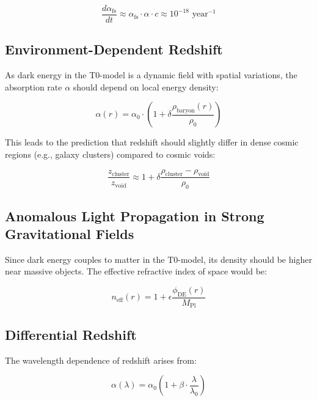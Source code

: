 \documentclass[a4paper,12pt]{article}
\theoremstyle{definition}
\theoremstyle{remark}
\begin{document}
	\begin{equation}
		\frac{d\alpha_{\text{fs}}}{dt} \approx \alpha_{\text{fs}} \cdot \alpha \cdot c \approx 10^{-18} \text{ year}^{-1}
	\end{equation}
	
	\subsection{Environment-Dependent Redshift}
	
	As dark energy in the T0-model is a dynamic field with spatial variations, the absorption rate \(\alpha\) should depend on local energy density:
	
	\begin{equation}
		\alpha(r) = \alpha_0 \cdot \left(1 + \delta\frac{\rho_{\text{baryon}}(r)}{\rho_0}\right)
	\end{equation}
	
	This leads to the prediction that redshift should slightly differ in dense cosmic regions (e.g., galaxy clusters) compared to cosmic voids:
	
	\begin{equation}
		\frac{z_{\text{cluster}}}{z_{\text{void}}} \approx 1 + \delta\frac{\rho_{\text{cluster}} - \rho_{\text{void}}}{\rho_0}
	\end{equation}
	
	\subsection{Anomalous Light Propagation in Strong Gravitational Fields}
	
	Since dark energy couples to matter in the T0-model, its density should be higher near massive objects. The effective refractive index of space would be:
	
	\begin{equation}
		n_{\text{eff}}(r) = 1 + \epsilon \frac{\phi_{\text{DE}}(r)}{M_{\text{Pl}}}
	\end{equation}
	
	\subsection{Differential Redshift}
	
	The wavelength dependence of redshift arises from:
	
	\begin{equation}
		\alpha(\lambda) = \alpha_0 \left(1 + \beta \cdot \frac{\lambda}{\lambda_0}\right)
	\end{equation}
	
\end{document}
